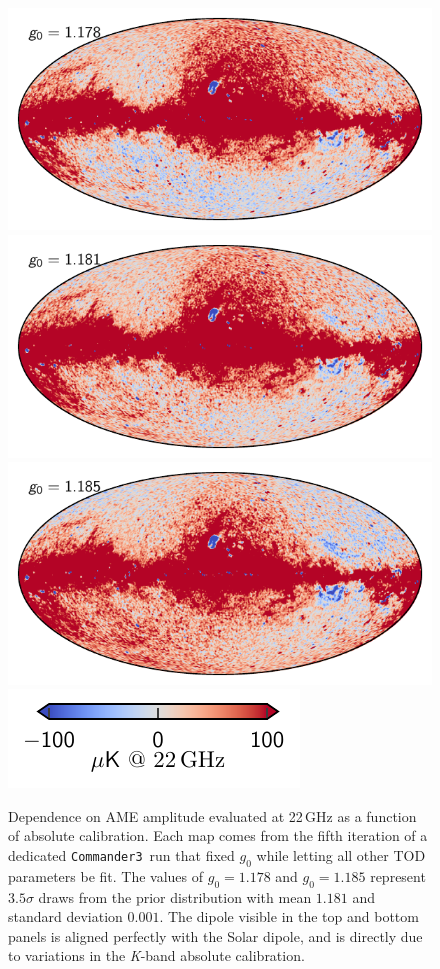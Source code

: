 \documentclass[twocolumn]{../../common/aa}
\def\commanderthree{\texttt{Commander3}}
\newcommand{\K}[0]{\textit K}
\begin{document}
\begin{figure}
	\centering
	\includegraphics[width=\columnwidth]{figures/ame_g01_178.pdf}
	\includegraphics[width=\columnwidth]{figures/ame_g01_181.pdf}
	\includegraphics[width=\columnwidth]{figures/ame_g01_185.pdf}
	\includegraphics[width=0.5\columnwidth]{figures/cbar_100uK.pdf}
	\caption{Dependence on AME amplitude evaluated at 22\,GHz as a function of absolute calibration. Each map comes from the fifth iteration of a dedicated \commanderthree\ run that fixed $g_0$ while letting all other TOD parameters be fit. The values of $g_0=1.178$ and $g_0=1.185$ represent $3.5\sigma$ draws from the prior distribution with mean $1.181$ and standard deviation $0.001$. The dipole visible in the top and bottom panels is aligned perfectly with the Solar dipole, and is directly due to variations in the \K-band absolute calibration.}
	\label{fig:g0_ame}
\end{figure}
\end{document}
